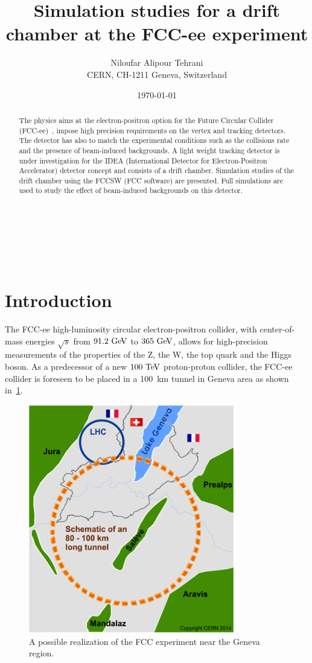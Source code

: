 \documentclass{cernatsnote}
\title{Simulation studies for a drift chamber at the FCC-ee experiment}
\author{
	Niloufar Alipour Tehrani \; \\
	CERN, CH-1211 Geneva, Switzerland
}
\date{\today}
\begin{document}
\maketitle

\begin{abstract}
	The physics aims at the electron-positron option for  the Future Circular Collider (FCC-ee)~\cite{Gomez-Ceballos:2013zzn}, impose high precision requirements on the vertex and tracking detectors.  The detector has also to match the experimental conditions such as the collisions rate and the presence of beam-induced backgrounds.
	A light weight tracking detector is under investigation for the IDEA (International Detector for Electron-Positron Accelerator) detector concept and consists of a drift chamber. Simulation studies of the drift chamber using the FCCSW (FCC software) are presented. Full simulations are used to study the effect of beam-induced backgrounds on this detector.
\end{abstract}
\\ \\ \\

\begingroup
\color{black}
\tableofcontents
\endgroup

\pagebreak

\section{Introduction}
The FCC-ee high-luminosity circular electron-positron collider, with center-of-mass energies $\sqrt{s}$ from $91.2\,\mathrm{\,Ge\kern -0.1em V}$ to
$365\,\mathrm{\,Ge\kern -0.1em V}$, allows for high-precision measurements of the properties of the Z, the W, the top quark and the Higgs boson. As a predecessor of a new $100\,\mathrm{\,Te\kern -0.1em V}$ proton-proton collider, the FCC-ee collider is foreseen to be placed in a 100~km tunnel in Geneva area as shown in~\cref{fig_fcc_cern}.

\begin{figure}[ht]
	\centering
	\includegraphics[width=0.8\textwidth]{figures/cernFCC.jpg}%
	\caption{A possible realization of the FCC experiment near the Geneva region.}
	\label{fig_fcc_cern}
\end{figure}
\end{document}
